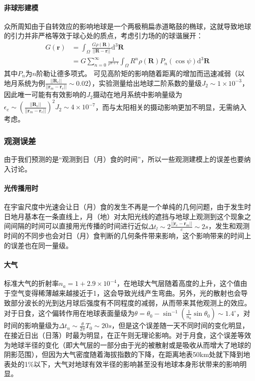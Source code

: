 \documentclass[hidelinks]{article}
\begin{document}
\paragraph{非球形建模}众所周知由于自转效应的影响地球是一个两极稍扁赤道略鼓的椭球，这就导致地球的引力并非严格等效于球心处的质点，考虑引力场的的球谐展开：
\begin{align*}
    G(\mathbf{r})&=\int_{\Omega}\frac{G\rho(\mathbf{R})}{||\mathbf{R}-\mathbf{r}||}\mathrm{d}^3\mathbf{R}\\
    &=G\sum_{n=0}^\infty\frac{1}{r^{n+1}}\int_\Omega R^n\rho(\mathbf{R})P_n(\cos{\psi})\mathrm{d}^3\mathbf{R}
\end{align*}
其中$P_n$为$n$阶勒让德多项式。
可见高阶矩的影响随着距离的增加而迅速减弱（以地月系统为例$\frac{||\mathbf{R}_e||}{||\mathbf{r}_m-\mathbf{r}_e||}\sim0.02$），实验测量给出地球二阶系数的量级$J_2\sim1\times10^{-3}$，因此唯一可能有有效影响的$J_2$摄动在地月系统中影响量级为$\epsilon_e\sim(\frac{||\mathbf{R}_e||}{||\mathbf{r}_m-\mathbf{r}_e||})^2J_2\sim4\times10^{-7}$，而与太阳相关的摄动影响更加不明显，无需纳入考虑。
\subsubsection{观测误差}
由于我们预测的是“观测到日（月）食的时间”，所以一些观测建模上的误差也要纳入讨论。
\paragraph{光传播用时}
在宇宙尺度中光速会让日（月）食的发生不再是一个单纯的几何问题，由于发生时日地月基本在一条直线上，月（地）对太阳光线的遮挡与地球上观测到这个现象之间间隔的时间可以直接用光传播的时间进行近似$\Delta t_l\sim2\frac{||\mathbf{r}_e-\mathbf{r}_m||}{c}\sim2s$，发生和观测时间的不同步也会对日（月）食判断的几何条件带来影响，这个影响带来的时间上的误差也在同一量级。
\paragraph{大气}
标准大气的折射率$n_a=1+2.9\times10^{-4}$，在地球大气层随着高度的上升，这个值由于空气变得稀薄越来越接近于1，这会导致光线产生弯曲。另外，光的散射也会导致部分波长的光到达月球后强度有不同程度的减弱，从而带来其他观测上的效应。对于日食，这个偏转作用在地球表面量级为$\theta=\theta_0-\sin^{-1}(\frac{1}{n_a}\sin\theta_0)\sim1.4^\circ$，对时间的影响量级为$\Delta t_n\sim\frac{\theta}{2\pi}T_0\sim20s$，但是这个误差随一天不同时间的变化明显，在接近日出（日落）时最为明显，在正午则无理论影响。对于月食，这个误差等效为地球半径的变化（即大气层的一部分由于光的被散射或是吸收从而增大了地球的阴影范围），但因为大气密度随着海拔指数的下降，在距离地表50km处就下降到地表处的1\%以下，大气对地球有效半径的影响甚至没有地球本身形状带来的影响明显。
\end{document}
